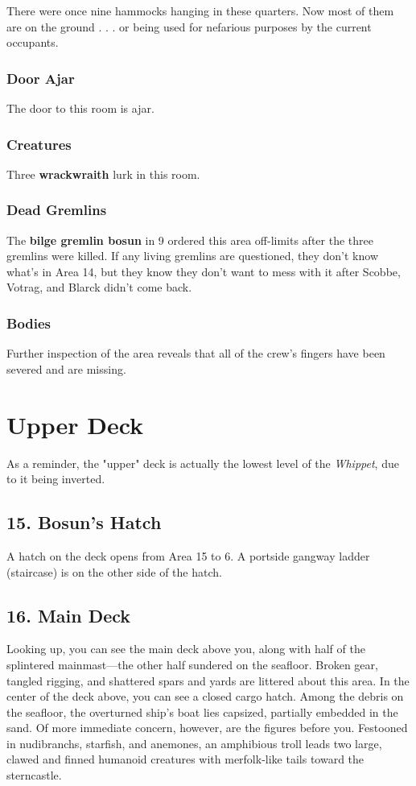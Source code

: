 \documentclass[10pt,a4paper,twoside,bg=print,twocolumn,openany,nodeprecatedcode]{dndbook}
\begin{document}
There were once nine hammocks hanging in these quarters. Now most of them are on the ground . . . or being used for nefarious purposes by the current occupants.

\subsubsection{Door Ajar}
The door to this room is ajar.

\subsubsection{Creatures}
Three \textbf{wrackwraith} lurk in this room.

\subsubsection{Dead Gremlins}
The \textbf{bilge gremlin bosun} in 9 ordered this area off-limits after the three gremlins were killed. If any living gremlins are questioned, they don't know what's in Area 14, but they know they don't want to mess with it after Scobbe, Votrag, and Blarck didn't come back.

\subsubsection{Bodies}
Further inspection of the area reveals that all of the crew's fingers have been severed and are missing.

\section{Upper Deck}
As a reminder, the "upper" deck is actually the lowest level of the \textit{Whippet}, due to it being inverted.

\subsection{15. Bosun's Hatch}
A hatch on the deck opens from Area 15 to 6. A portside gangway ladder (staircase) is on the other side of the hatch.

\subsection{16. Main Deck}
\begin{DndReadAloud}{}
Looking up, you can see the main deck above you, along with half of the splintered mainmast—the other half sundered on the seafloor. Broken gear, tangled rigging, and shattered spars and yards are littered about this area. In the center of the deck above, you can see a closed cargo hatch. Among the debris on the seafloor, the overturned ship's boat lies capsized, partially embedded in the sand. Of more immediate concern, however, are the figures before you. Festooned in nudibranchs, starfish, and anemones, an amphibious troll leads two large, clawed and finned humanoid creatures with merfolk-like tails toward the sterncastle.

\end{DndReadAloud}
\end{document}
